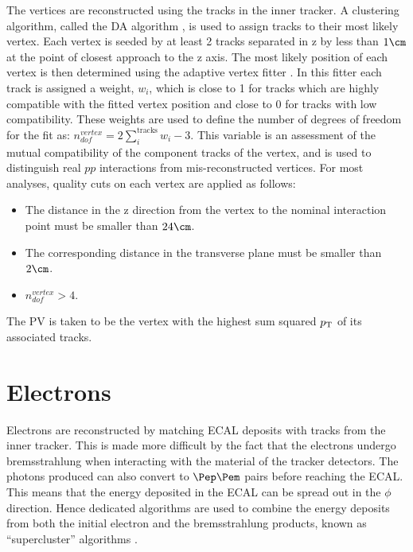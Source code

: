 The vertices are reconstructed using the tracks in the inner
tracker. A clustering algorithm, called the \ac{DA} algorithm
\cite{DetAnnealing}, is used to assign tracks to their most likely 
vertex. Each vertex is seeded by at least 2 tracks separated in z by less than
$1 \cm$ at the point of closest approach to the z axis.
The most likely position of each vertex is then determined using the
adaptive vertex fitter \cite{adaptivevertex}. In
this fitter each track is assigned a weight, $w_{i}$, which is close to 1 for tracks which
are highly compatible with the fitted vertex position and close to 0 for tracks with low
compatibility. These weights are used to define the number of degrees of freedom
for the fit as: $n_{dof}^{vertex} = 2\sum_{i}^{\text{tracks}}w_{i}-3$. This
variable is an assessment of the mutual compatibility of the component tracks of
the vertex, and is used to distinguish real $pp$ interactions from
mis-reconstructed vertices. For most analyses, quality cuts \cite{CMS-PAS-TRK-10-005} on each vertex are
applied as follows:
\begin{itemize}
\item The distance in the z direction from the vertex to the nominal interaction
point must be smaller than $24\cm$. 
\item The corresponding distance in the transverse plane must be smaller than
$2\cm$.
\item $n_{dof}^{vertex} > 4$.
\end{itemize}

The \ac{PV} is taken to be the vertex with the highest sum squared $p_{\mathrm{T}}$ of its
associated tracks. 

\section{Electrons}
\label{sec:electrons}

Electrons are reconstructed by matching \ac{ECAL} deposits with tracks from the
inner tracker. This is made more difficult by the fact that the electrons
undergo bremsstrahlung when interacting with the material of the tracker
detectors. The photons produced can also convert to $\Pep\Pem$ pairs before
reaching the \ac{ECAL}. This means that the energy deposited in the \ac{ECAL} 
can be spread out in the $\phi$ direction. Hence dedicated algorithms are used
to combine the energy deposits from both the initial electron and the
bremsstrahlung products, known as ``supercluster'' algorithms \cite{ElectronReco}.

